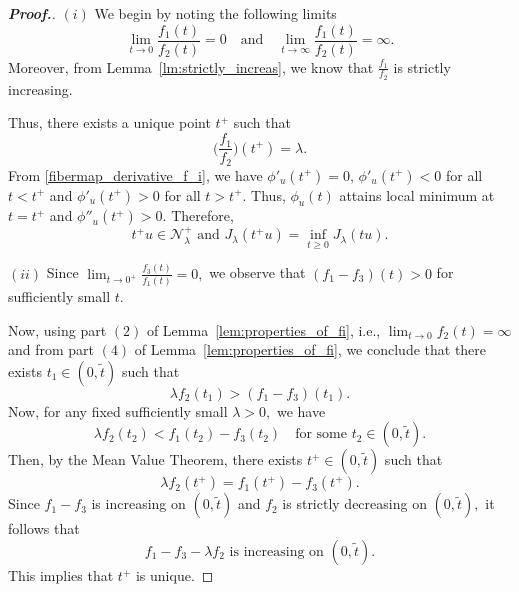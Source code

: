 \documentclass[11pt]{article}
\newcommand{\la} {\lambda}
\newcommand{\ds} {\displaystyle}
\begin{document}
\begin{proof}[\bf Proof.]
\textbf{$(i)$} We begin by noting the following limits
\begin{equation*}
\lim_{t \to 0} 
\frac{f_1(t)}{f_2(t)} = 0 \quad\text{and} 
\quad\lim_{t \to \infty} 
\frac{f_1(t)}{f_2(t)} = \infty.
\end{equation*}
Moreover, from Lemma~\ref{lm:strictly_increas}, 
we know that $\frac{f_1}{f_2}$
is strictly increasing.

 Thus, there exists a unique point $t^+$
such that
\begin{equation*}
\Big  ( \frac{f_1 }{f_2} 
\Big  )(t^+) = \lambda. 
\end{equation*}
From \eqref{fibermap_derivative_f_i}, 
we have $\phi'_u(t^+)=0,\,\phi'_u(t^+)<0$
for all $t<t^+$
and $\phi'_u(t^+)>0$
for all $t>t^+.$
Thus, $\phi_u(t)$
attains local minimum at $t=t^+$
and $\phi''_u(t^+)>0.$
Therefore,
\begin{equation*}
t^+ u \in \mathcal{N}_\lambda^+ 
\text{ and } J_\la(t^+u)=\ds\inf_{t\ge 0}J_\la(tu).
\end{equation*}

\textbf{$(ii)$} Since $  \lim_{t \to 0^+} 
\frac{f_3(t)}{f_1(t)} = 0,$
we observe that $(f_1 - f_3)(t) > 0$
for sufficiently small $t$.

 Now, using part $(2)$
of Lemma~\ref{lem:properties_of_fi}, 
i.e.,  $\lim_{t \to 0} f_2(t) = \infty$
and from part $(4)$
of Lemma~\ref{lem:properties_of_fi}, 
we conclude that there exists 
$t_1 \in (0, \tilde{t})$
 such that
\begin{equation*}
\lambda f_2(t_1) > (f_1 - f_3)(t_1). 
\end{equation*}
 Now, for any fixed sufficiently small $\lambda > 0,$
we have
\begin{equation*}
\lambda f_2(t_2) < f_1(t_2) - f_3(t_2) 
\quad \text{for some } t_2 \in (0, \tilde{t}). 
\end{equation*}
 Then, by the Mean Value Theorem, 
 there exists $t^+ \in (0, \tilde{t})$
such that
\begin{equation*}
\lambda f_2(t^+) = f_1(t^+) - f_3(t^+). 
\end{equation*} 
Since $f_1 - f_3$
is increasing on $(0, \tilde{t})$
and $f_2$
is strictly decreasing on $(0, \tilde{t}),$
it follows that
\begin{equation*}
f_1 - f_3 - \lambda f_2 
\text{ is increasing on } (0, \tilde{t}). 
\end{equation*}
This implies that $t^+$
is unique.


\end{proof}
\end{document}
